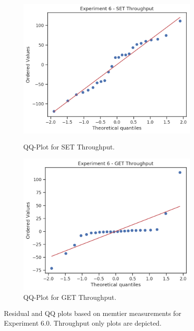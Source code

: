 \begin{figure}
        \begin{subfigure}[t!]{0.45\textwidth}
            \centering
            \includegraphics[width=\textwidth]{../data_analysis/figures/6-0_throughput-set-qq.png}
            \caption{QQ-Plot for SET Throughput.\label{fig:6_qq_set_tp}}
            \includegraphics[width=\textwidth]{../data_analysis/figures/6-0_throughput-get-qq.png}
            \caption{QQ-Plot for GET Throughput.\label{fig:6_qq_get_tp}}
        \end{subfigure}
        \caption{Residual and QQ plots based on memtier measurements for Experiment 6.0. Throughput only plots
                 are depicted.\label{fig:6_tp}}
    \end{figure}

